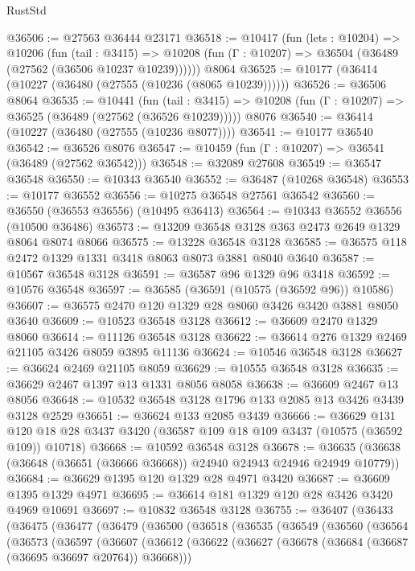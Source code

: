 \begin{lexlean}{RustStd}
\begin{coremodule}
@36506 := @27563 @36444 @23171
@36518 := @10417
    (fun (lets : @10204) =>
    @10206
      (fun (tail : @3415) =>
      @10208 (fun (Γ : @10207) => @36504 (@36489 (@27562 (@36506 @10237 @10239))))))
    @8064
@36525 := @10177 (@36414 (@10227 (@36480 (@27555 (@10236 (@8065 @10239))))))
@36526 := @36506 @8064
@36535 := @10441
    (fun (tail : @3415) => @10208 (fun (Γ : @10207) => @36525 (@36489 (@27562 (@36526 @10239)))))
    @8076
@36540 := @36414 (@10227 (@36480 (@27555 (@10236 @8077))))
@36541 := @10177 @36540
@36542 := @36526 @8076
@36547 := @10459 (fun (Γ : @10207) => @36541 (@36489 (@27562 @36542)))
@36548 := @32089 @27608
@36549 := @36547 @36548
@36550 := @10343 @36540
@36552 := @36487 (@10268 @36548)
@36553 := @10177 @36552
@36556 := @10275 @36548 @27561 @36542
@36560 := @36550 (@36553 @36556) (@10495 @36413)
@36564 := @10343 @36552 @36556 (@10500 @36486)
@36573 := @13209 @36548 @3128 @363 @2473 @2649 @1329 @8064 @8074 @8066
@36575 := @13228 @36548 @3128
@36585 := @36575 @118 @2472 @1329 @1331 @3418 @8063 @8073 @3881 @8040 @3640
@36587 := @10567 @36548 @3128
@36591 := @36587 @96 @1329 @96 @3418
@36592 := @10576 @36548
@36597 := @36585 (@36591 (@10575 (@36592 @96)) @10586)
@36607 := @36575 @2470 @120 @1329 @28 @8060 @3426 @3420 @3881 @8050 @3640
@36609 := @10523 @36548 @3128
@36612 := @36609 @2470 @1329 @8060
@36614 := @11126 @36548 @3128
@36622 := @36614 @276 @1329 @2469 @21105 @3426 @8059 @3895 @11136
@36624 := @10546 @36548 @3128
@36627 := @36624 @2469 @21105 @8059
@36629 := @10555 @36548 @3128
@36635 := @36629 @2467 @1397 @13 @1331 @8056 @8058
@36638 := @36609 @2467 @13 @8056
@36648 := @10532 @36548 @3128 @1796 @133 @2085 @13 @3426 @3439 @3128 @2529
@36651 := @36624 @133 @2085 @3439
@36666 := @36629
    @131
    @120
    @18
    @28
    @3437
    @3420
    (@36587 @109 @18 @109 @3437 (@10575 (@36592 @109)) @10718)
@36668 := @10592 @36548 @3128
@36678 := @36635 (@36638 (@36648 (@36651 (@36666 @36668)) @24940 @24943 @24946 @24949 @10779))
@36684 := @36629 @1395 @120 @1329 @28 @4971 @3420
@36687 := @36609 @1395 @1329 @4971
@36695 := @36614 @181 @1329 @120 @28 @3426 @3420 @4969 @10691
@36697 := @10832 @36548 @3128
@36755 := @36407
    (@36433
      (@36475
        (@36477
          (@36479
            (@36500
              (@36518
                (@36535
                  (@36549
                    (@36560
                      (@36564
                        (@36573
                          (@36597
                            (@36607
                              (@36612
                                (@36622
                                  (@36627 (@36678 (@36684 (@36687 (@36695 @36697 @20764)) @36668)))

\end{coremodule}
\end{lexlean}

